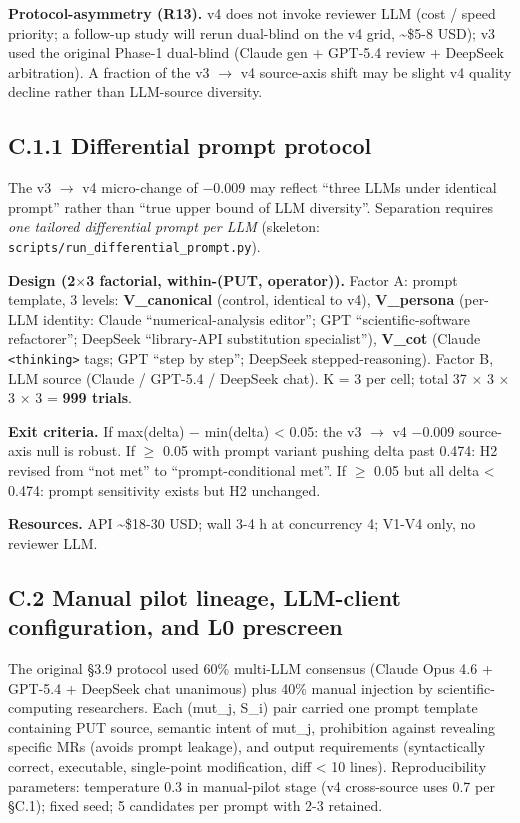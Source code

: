 \documentclass[manuscript,screen,review]{acmart}
\begin{document}
\textbf{Protocol-asymmetry (R13).} v4 does not invoke reviewer LLM (cost
/ speed priority; a follow-up study will rerun dual-blind on the v4
grid, \textasciitilde\$5-8 USD); v3 used the original Phase-1 dual-blind
(Claude gen + GPT-5.4 review + DeepSeek arbitration). A fraction of the
v3 $\to$ v4 source-axis shift may be slight v4 quality decline rather than
LLM-source diversity.

\subsection{C.1.1 Differential prompt protocol}\label{c.1.1-differential-prompt-protocol-future-work-commitment}

The v3 $\to$ v4 micro-change of $-$0.009 may reflect ``three LLMs under
identical prompt'' rather than ``true upper bound of LLM diversity''.
Separation requires \emph{one tailored differential prompt per LLM}
(skeleton: \texttt{scripts/run\_differential\_prompt.py}).

\textbf{Design (2$\times$3 factorial, within-(PUT, operator)).} Factor A:
prompt template, 3 levels: \textbf{V\_canonical} (control, identical to
v4), \textbf{V\_persona} (per-LLM identity: Claude ``numerical-analysis
editor''; GPT ``scientific-software refactorer''; DeepSeek ``library-API
substitution specialist''), \textbf{V\_cot} (Claude
\texttt{\textless{}thinking\textgreater{}} tags; GPT ``step by step'';
DeepSeek stepped-reasoning). Factor B, LLM source (Claude / GPT-5.4 /
DeepSeek chat). K = 3 per cell; total 37 $\times$ 3 $\times$ 3 $\times$ 3 = \textbf{999
trials}.

\textbf{Exit criteria.} If max(delta) $-$ min(delta) \textless{} 0.05: the
v3 $\to$ v4 $-$0.009 source-axis null is robust. If $\geq$ 0.05 with prompt variant
pushing delta past 0.474: H2 revised from ``not met'' to
``prompt-conditional met''. If $\geq$ 0.05 but all delta \textless{} 0.474:
prompt sensitivity exists but H2 unchanged.

\textbf{Resources.} API \textasciitilde\$18-30 USD; wall 3-4 h at
concurrency 4; V1-V4 only, no reviewer LLM.

\subsection{C.2 Manual pilot lineage, LLM-client configuration, and L0 prescreen}\label{c.2-manual-pilot-lineage-llm-client-configuration-and-l0-prescreen}

The original §3.9 protocol used 60\% multi-LLM consensus (Claude Opus
4.6 + GPT-5.4 + DeepSeek chat unanimous) plus 40\% manual injection by
scientific-computing researchers. Each (mut\_j, S\_i) pair carried one
prompt template containing PUT source, semantic intent of mut\_j,
prohibition against revealing specific MRs (avoids prompt leakage), and
output requirements (syntactically correct, executable, single-point
modification, diff \textless{} 10 lines). Reproducibility parameters:
temperature 0.3 in manual-pilot stage (v4 cross-source uses 0.7 per
§C.1); fixed seed; 5 candidates per prompt with 2-3 retained.
\end{document}
